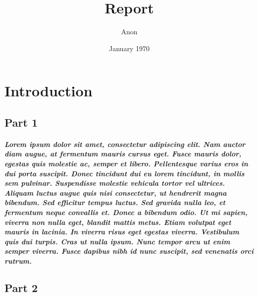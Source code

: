 \documentclass[12pt]{report}
\title{Report}
\author{Anon}
\date{January 1970}
\begin{document}
    \maketitle


    \tableofcontents

    \titleformat{\chapter}[display]
    {\normalfont\bfseries\Huge}{}{0pt}{\thechapter\quad}
    \titlespacing*{\chapter}{0pt}{50pt}{20pt}

    \chapter{Introduction}
    
        \section{Part 1}
        \paragraph{Lorem ipsum dolor sit amet, consectetur adipiscing elit. Nam auctor diam augue, at fermentum mauris cursus eget. Fusce mauris dolor, egestas quis molestie ac, semper et libero. Pellentesque varius eros in dui porta suscipit. Donec tincidunt dui eu lorem tincidunt, in mollis sem pulvinar. Suspendisse molestie vehicula tortor vel ultrices. Aliquam luctus augue quis nisi consectetur, ut hendrerit magna bibendum. Sed efficitur tempus luctus. Sed gravida nulla leo, et fermentum neque convallis et. Donec a bibendum odio. Ut mi sapien, viverra non nulla eget, blandit mattis metus. Etiam volutpat eget mauris in lacinia. In viverra risus eget egestas viverra. Vestibulum quis dui turpis. Cras ut nulla ipsum. Nunc tempor arcu ut enim semper viverra. Fusce dapibus nibh id nunc suscipit, sed venenatis orci rutrum. }
        \section{Part 2}
    
\end{document}
